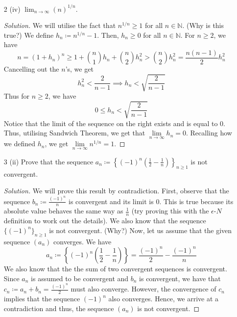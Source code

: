 \documentclass[12pt]{article}
\def\ddfrac#1#2{\displaystyle\frac{\displaystyle #1}{\displaystyle #2}}
\theoremstyle{definition}
\newenvironment{soln}{\begin{proof}[Solution]}{\end{proof}}
\begin{document}
\begin{enumerate}[leftmargin=*]
    \itemsep0.5em
    \item[2 (iv)] $\displaystyle\lim_{n\to \infty}(n)^{1/n}.$
    \begin{soln}
        We will utilise the fact that $n^{1/n} \geq 1$ for all $n \in \mathbb{N}$. (Why is this true?) We define $h_n \coloneqq n^{1/n} - 1$. Then, $h_n \geq 0$ for all $n \in \mathbb{N}$. For $n\geq2$, we have
        \[
            n = (1+h_n)^n \geq 1 + \binom{n}{1} h_n + \binom{n}{2} h_n^2 > \binom{n}{2} h_n^2 = \frac{n(n-1)}{2} h_n^2
        \]
        Cancelling out the $n$'s, we get
        \[
            h_n^2 < \frac{2}{n-1} \implies h_n < \sqrt{\frac{2}{n-1}}
        \]  
        Thus for $n \geq 2$, we have
        \[
            0 \leq h_n < \sqrt{\frac{2}{n-1}}
        \]
        Notice that the limit of the sequence on the right exists and is equal to $0$. Thus, utilising Sandwich Theorem, we get that $\lim\limits_{n \to \infty} h_n = 0$. Recalling how we defined $h_n$, we get $\lim\limits_{n \to \infty} n^{1/n} = 1$.
    \end{soln}
    
    \newpage
    
    \item[3 (ii)] Prove that the sequence $a_n \coloneqq \left\{ (-1)^n \left( \ddfrac{1}{2} - \ddfrac{1}{n} \right) \right\}_{n \geq 1}$ is not convergent.
    
    \begin{soln}
        We will prove this result by contradiction. First, observe that the sequence $b_n \coloneqq \ddfrac{(-1)^n}{n}$ is convergent and its limit is $0$. This is true because its absolute value behaves the same way as $\ddfrac{1}{n}$ (try proving this with the $\epsilon$-$N$ definition to work out the details). We also know that the sequence $\{(-1)^n\}_{n \geq 1}$ is not convergent. (Why?) Now, let us assume that the given sequence $(a_n)$ converges. We have
        \[
            a_n \coloneqq \left\{ (-1)^n \left( \ddfrac{1}{2} - \ddfrac{1}{n} \right) \right\} = \frac{(-1)^n}{2} - \frac{(-1)^n}{n}
        \]
        We also know that the the sum of two convergent sequences is convergent. Since $a_n$ is assumed to be convergent and $b_n$ is convergent, we have that $c_n \coloneqq a_n + b_n = \ddfrac{(-1)^n}{2}$ must also converge. However, the convergence of $c_n$ implies that the sequence $(-1)^n$ also converges. Hence, we arrive at a contradiction and thus, the sequence $(a_n)$ is not convergent.
        

\end{soln}
\end{enumerate}
\end{document}
